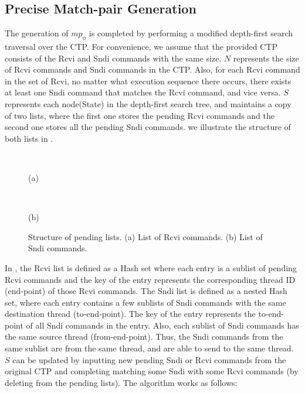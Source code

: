 \subsection{Precise Match-pair Generation}

The generation of $mp_{\phi}$ is completed by performing a modified depth-first search traversal over the CTP. For convenience, we assume that the provided CTP consists of the Rcvi and Sndi commands with the same size. $N$ represents the size of Rcvi commands and Sndi commands in the CTP. Also, for each Rcvi command in the set of Rcvi, no matter what execution sequence there occurs, there exists at least one Sndi command that matches the Rcvi command, and vice versa. $S$ represents each node(State) in the depth-first search tree, and maintains a copy of two lists, where the first one stores the pending Rcvi commands and the second one stores all the pending Sndi commands. we illustrate the structure of both lists in .
\begin{figure}
\setlength{\tabcolsep}{7pt}
\scalebox{0.68}{\usebox{\boxReviList}} \\
\begin{center}
(a)
\end{center}


\scalebox{0.68}{\usebox{\boxSendiList}} \\
\begin{center}
(b)
\end{center}
\caption{Structure of pending lists. (a) List of Rcvi commands. (b) List of Sndi commands.}
\label{fig:data-structure-pendinglist}
\end{figure}
 In , the Rcvi list is defined as a Hash set where each entry is a sublist of pending Rcvi commands and the key of the entry represents the corresponding thread ID (end-point) of those Rcvi commands.
The Sndi list is defined as a nested Hash set, where each entry contains a few sublists of Sndi commands with the same destination thread (to-end-point). The key of the entry represents the to-end-point of all Sndi commands in the entry. Also, each sublist of Sndi commands has the same source thread (from-end-point). Thus, the Sndi commands from the same sublist are from the same thread, and are able to send to the same thread. $S$ can be updated by inputting new pending Sndi or Rcvi commands from the original CTP and completing matching some Sndi with some Rcvi commands (by deleting from the pending lists). The algorithm works as follows:

